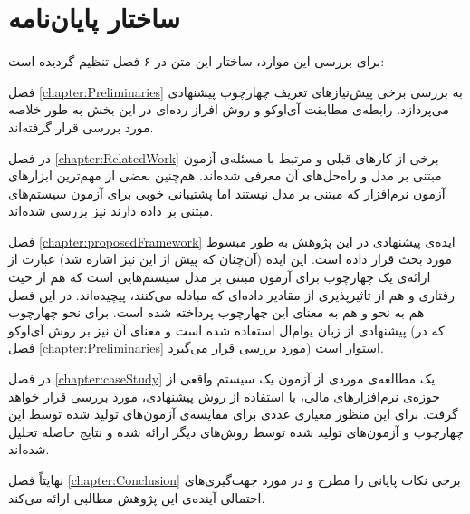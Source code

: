 \section{ساختار پایان‌نامه}
برای بررسی این موارد، ساختار این متن در ۶ فصل تنظیم گردیده است:
\begin{strict_itemize}
\item
 فصل \ref{chapter:Preliminaries} به بررسی برخی پیش‌نیازهای تعریف چهارچوب پیشنهادی می‌پردازد. رابطه‌ی مطابقت آی‌اوکو و روش افراز رده‌ای در این بخش به طور خلاصه مورد بررسی قرار گرفته‌اند.
\item
در فصل \ref{chapter:RelatedWork} برخی از کارهای قبلی و مرتبط با مسئله‌ی آزمون مبتنی بر مدل و راه‌حل‌های آن معرفی شده‌اند. هم‌چنین بعضی از مهم‌ترین ابزارهای آزمون نرم‌افزار که مبتنی بر مدل نیستند اما پشتیبانی خوبی برای آزمون سیستم‌های مبتنی بر داده دارند نیز بررسی شده‌اند. 
\item
فصل \ref{chapter:proposedFramework} ایده‌ی پیشنهادی در این پژوهش به طور مبسوط مورد بحث قرار داده است. این ایده (آن‌چنان که پیش از این نیز اشاره شد) عبارت از ارائه‌ی یک چهارچوب برای آزمون مبتنی بر مدل سیستم‌هایی است که هم از حیث رفتاری و هم از تاثیرپذیری از مقادیر داده‌ای که مبادله می‌کنند، پیچیده‌اند. در این فصل هم به نحو و هم به معنای این چهارچوب پرداخته شده است. برای نحو چهارچوب پیشنهادی از زبان یو‌ام‌ال استفاده شده است و معنای آن نیز بر روش آی‌اوکو (که در فصل \ref{chapter:Preliminaries} مورد بررسی قرار می‌گیرد) استوار است.
\item
 در فصل \ref{chapter:caseStudy} یک مطالعه‌ی موردی از آزمون یک سیستم واقعی از حوزه‌ی نرم‌افزارهای مالی، با استفاده از روش پیشنهادی، مورد بررسی قرار خواهد گرفت. برای این منظور معیاری عددی برای مقایسه‌ی آزمون‌های تولید شده توسط این چهارچوب و آزمون‌های تولید شده توسط روش‌های دیگر ارائه شده و نتایج حاصله تحلیل شده‌اند.
\item
نهایتاً فصل \ref{chapter:Conclusion} برخی نکات پایانی را مطرح و در مورد جهت‌گیری‌های احتمالی آینده‌ی این پژوهش مطالبی ارائه می‌کند.
\end{strict_itemize}